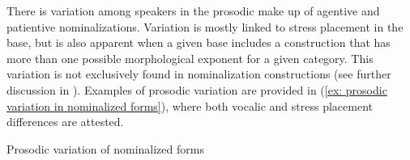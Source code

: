     \z
\z

There is variation among speakers in the prosodic make up of agentive and patientive nominalizations. Variation is mostly linked to stress placement in the base, but is also apparent when a given base includes a construction that has more than one possible morphological exponent for a given category. This variation is not exclusively found in nominalization constructions (see further discussion in ). Examples of prosodic variation are provided in (\ref{ex: prosodic variation in nominalized forms}), where both vocalic and stress placement differences are attested.

\ea\label{ex: prosodic variation in nominalized forms}
{Prosodic variation of nominalized forms}

